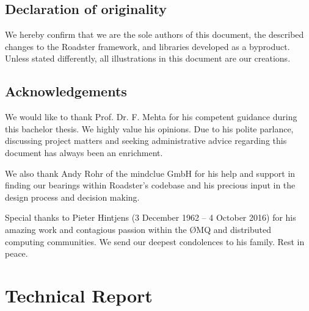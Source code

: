 \documentclass[a4paper]{report}
\newcommand\zmq{{\O}MQ\xspace}
\begin{document}
\chapter*{Declaration of originality}
We hereby confirm that we are the sole authors of this document, the
described changes to the Roadster framework, and libraries developed as a
byproduct. Unless stated differently, all illustrations in this document are
our creations.

%

\chapter*{Acknowledgements}
We would like to thank Prof. Dr. F. Mehta for his competent guidance during
this bachelor thesis.  We highly value his opinions. Due to his polite
parlance, discussing project matters and seeking administrative advice
regarding this document has always been an enrichment.

We also thank Andy Rohr of the mindclue GmbH for his help and support in
finding our bearings within Roadster's codebase and his precious input in the
design process and decision making.

Special thanks to Pieter Hintjens {\textdagger} (3 December 1962 -- 4 October
2016) for his amazing work and contagious passion within the \zmq and
distributed computing communities. We send our deepest condolences to his
family. Rest in peace.


\setcounter{tocdepth}{3}
\tableofcontents
\listoffigures
\listoftables
\listoflistings

\pagebreak
{}
\setcounter{page}{1}
\setcounter{secnumdepth}{3}



\part{Technical Report}







\printbibliography
\printglossaries
\end{document}
